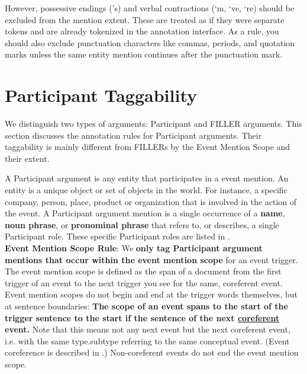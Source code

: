 However, possessive endings ('s) and verbal contractions (‘m, ‘ve, ‘re) should be excluded from the mention extent.
These are treated as if they were separate tokens and are already tokenized in the annotation interface.
As a rule, you should also exclude punctuation characters like commas, periods, and quotation marks unless the same entity mention continues after the punctuation mark.

\section{Participant Taggability}

We distinguish two types of arguments: Participant and FILLER arguments.
This section discusses the annotation rules for Participant arguments.
Their taggability is mainly different from FILLERs by the Event Mention Scope and their extent.

A Participant argument is any entity that participates in a  event mention.
An entity is a unique object or set of objects in the world.
For instance, a specific company, person, place, product or organization that is involved in the action of the event. 
A Participant argument mention is a single occurrence of a \textbf{name}, \textbf{noun phrase}, or \textbf{pronominal phrase} that refers to, or describes, a single Participant role.
These specific Participant roles are listed in .\\

\textbf{Event Mention Scope Rule}:
We \textbf{only tag Participant argument mentions that occur within the event mention scope} for an event trigger.
The event mention scope is defined as the span of a document from the first trigger of an event to the next trigger you see for the same, coreferent event.
Event mention scopes do not begin and end at the trigger words themselves, but at sentence boundaries:
\textbf{The scope of an event spans to the start of the trigger sentence to the start if the sentence of the next \underline{coreferent} event.}
Note that this means not any next event but the next coreferent event, i.e. with the same type.subtype referring to the same conceptual event.
(Event coreference is described in .)
Non-coreferent events do not end the event mention scope.

